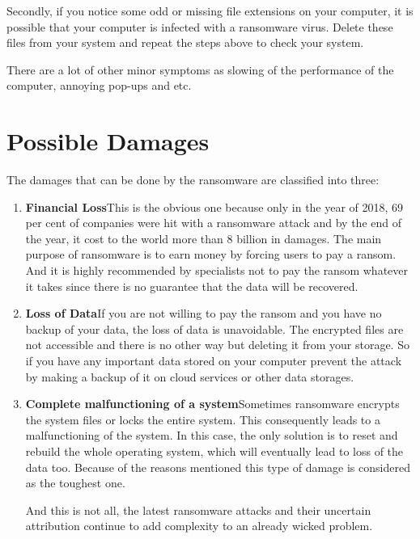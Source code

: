 \documentclass{article}
\begin{document}
	Secondly, if you notice some odd or missing file extensions on your computer, it is possible that your computer is infected with a ransomware virus. Delete these files from your system and repeat the steps above to check your system.
	
	There are a lot of other minor symptoms as slowing of the performance of the computer, annoying pop-ups and etc.

\section{Possible Damages}
    The damages that can be done by the ransomware are classified into three:
    \begin{enumerate}
        \item \textbf{Financial Loss}\newline This is the obvious one because only in the year of 2018, 69 per cent of companies were hit with a ransomware attack and by the end of the year, it cost to the world more than 8 billion in damages.\cite{cit5} The main purpose of ransomware is to earn money by forcing users to pay a ransom. And it is highly recommended by specialists not to pay the ransom whatever it takes since there is no guarantee that the data will be recovered.
        
        \item \textbf{Loss of Data}\newline If you are not willing to pay the ransom and you have no backup of your data, the loss of data is unavoidable. The encrypted files are not accessible and there is no other way but deleting it from your storage. So if you have any important data stored on your computer prevent the attack by making a backup of it on cloud services or other data storages.
        
        \item \textbf{Complete malfunctioning of a system}\newline Sometimes ransomware encrypts the system files or locks the entire system. This consequently leads to a malfunctioning of the system. In this case, the only solution is to reset and rebuild the whole operating system, which will eventually lead to loss of the data too. Because of the reasons mentioned this type of damage is considered as the toughest one.
        
    	And this is not all, the latest ransomware attacks and their uncertain attribution continue to add complexity to an already wicked problem.\cite{cit6}
    \end{enumerate}
    
\end{document}
